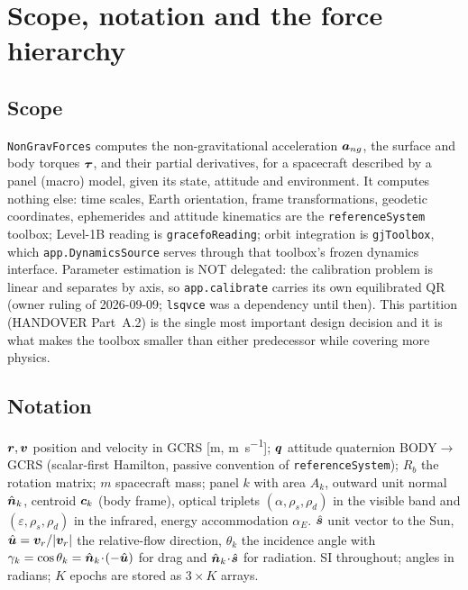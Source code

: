 \section{Scope, notation and the force hierarchy}
\subsection{Scope}
\texttt{NonGravForces} computes the non-gravitational acceleration $\bm{a}_{ng}$, the surface and body torques $\bm{\tau}$, and their partial derivatives, for a spacecraft described by a panel (macro) model, given its state, attitude and environment. It computes nothing else: time scales, Earth orientation, frame transformations, geodetic coordinates, ephemerides and attitude kinematics are the \texttt{referenceSystem} toolbox; Level-1B reading is \texttt{gracefoReading}; orbit integration is \texttt{gjToolbox}, which \texttt{app.DynamicsSource} serves through that toolbox's frozen dynamics interface. Parameter estimation is NOT delegated: the calibration problem is linear and separates by axis, so \texttt{app.calibrate} carries its own equilibrated QR (owner ruling of 2026-09-09; \texttt{lsqvce} was a dependency until then). This partition (HANDOVER Part~A.2) is the single most important design decision and it is what makes the toolbox smaller than either predecessor while covering more physics.

\subsection{Notation}
$\bm{r},\bm{v}$ position and velocity in GCRS [\si{\metre}, \si{\metre\per\second}]; $\bm{q}$ attitude quaternion BODY$\to$GCRS (scalar-first Hamilton, passive convention of \texttt{referenceSystem}); $R_{b}$ the rotation matrix; $m$ spacecraft mass; panel $k$ with area $A_k$, outward unit normal $\hat{\bm{n}}_k$, centroid $\bm{c}_k$ (body frame), optical triplets $(\alpha,\rho_s,\rho_d)$ in the visible band and $(\varepsilon,\rho_s,\rho_d)$ in the infrared, energy accommodation $\alpha_E$. $\hat{\bm{s}}$ unit vector to the Sun, $\hat{\bm{u}}=\bm{v}_r/|\bm{v}_r|$ the relative-flow direction, $\theta_k$ the incidence angle with $\gamma_k=\cos\theta_k=\hat{\bm{n}}_k\!\cdot\!(-\hat{\bm{u}})$ for drag and $\hat{\bm{n}}_k\!\cdot\!\hat{\bm{s}}$ for radiation. SI throughout; angles in radians; $K$ epochs are stored as $3\times K$ arrays.

